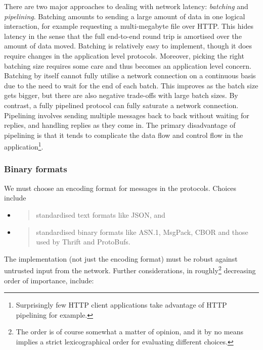 \documentclass[11pt,a4paper]{article}
\begin{document}
There are two major approaches to dealing with network latency:
\emph{batching} and \emph{pipelining}. Batching amounts to sending a
large amount of data in one logical interaction, for example requesting
a multi-megabyte file over HTTP. This hides latency in the sense that
the full end-to-end round trip is amortised over the amount of data
moved. Batching is relatively easy to implement, though it does require
changes in the application level protocols. Moreover, picking the right
batching size requires some care and thus becomes an application level
concern. Batching by itself cannot fully utilise a network connection on
a continuous basis due to the need to wait for the end of each batch.
This improves as the batch size gets bigger, but there are also negative
trade-offs with large batch sizes. By contrast, a fully pipelined
protocol can fully saturate a network connection. Pipelining involves
sending multiple messages back to back without waiting for replies, and
handling replies as they come in. The primary disadvantage of pipelining
is that it tends to complicate the data flow and control flow in the
application\footnote{Surprisingly few HTTP client applications take
  advantage of HTTP pipelining for example.}.

\subsubsection{Binary formats}
\label{binary-formats}

We must choose an encoding format for messages in the protocols. Choices
include

\begin{itemize}
\item
  \begin{quote}
  standardised text formats like JSON, and
  \end{quote}
\item
  \begin{quote}
  standardised binary formats like ASN.1, MsgPack, CBOR and those used
  by Thrift and ProtoBufs.
  \end{quote}
\end{itemize}

The implementation (not just the encoding format) must be robust against
untrusted input from the network. Further considerations, in
roughly\footnote{The order is of course somewhat a matter of opinion,
  and it by no means implies a strict lexicographical order for
  evaluating different choices.} decreasing order of importance,
include:
\end{document}
